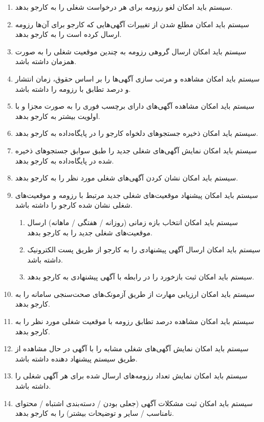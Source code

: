 \documentclass[12pt]{article}
\begin{document}
\begin{itemize}
\begin{enumerate}
\begin{enumerate}
			\end{enumerate}
			\item سیستم باید امکان لغو رزومه برای هر درخواست شغلی را به کارجو بدهد.
			\item سیستم باید امکان مطلع شدن از تغییرات آگهی‌هایی که کارجو برای آن‌ها رزومه ارسال کرده است را به کارجو بدهد.
			\item سیستم باید امکان ارسال گروهی رزومه به چندین موقعیت شغلی را به صورت همزمان داشته باشد.
			\item سیستم باید امکان مشاهده و مرتب سازی آگهی‌ها را بر اساس حقوق، زمان انتشار و درصد تطابق با رزومه را داشته باشد.
			\item سیستم باید امکان مشاهده آگهی‌های دارای برچسب فوری را به صورت مجزا و با اولویت بیشتر به کارجو بدهد.
			\item سیستم باید امکان ذخیره جستجوهای دلخواه کارجو را در پایگاه‌داده به کارجو بدهد.
			\item سیستم باید امکان نمایش آگهی‌های شغلی جدید را طبق سوابق جستجوهای ذخیره شده در پایگاه‌داده به کارجو بدهد.
			\item سیستم باید امکان نشان کردن آگهی‌های شغلی مورد نظر را به کارجو بدهد.
			\item سیستم باید امکان پیشنهاد موقعیت‌های شغلی جدید مرتبط با رزومه و موقعیت‌های شغلی نشان شده کارجو را داشته باشد.
			\begin{enumerate}
				\renewcommand{\labelenumii}{-R\arabic{enumi}.\arabic{enumii}}
				\item سیستم باید امکان انتخاب بازه زمانی (روزانه / هفتگی / ماهانه) ارسال موقعیت‌های شغلی جدید را به کارجو بدهد.
				\item سیستم باید امکان ارسال آگهی پیشنهادی را به کارجو از طریق پست الکترونیک داشته باشد.
				\item سیستم باید امکان ثبت بازخورد را در رابطه با آگهی پیشنهادی به کارجو بدهد.
			\end{enumerate}
			\item سیستم باید امکان ارزیابی مهارت از طریق آزمونک‌های صحت‌سنجی سامانه را به کارجو بدهد.
			\item سیستم باید امکان مشاهده درصد تطابق رزومه با موقعیت شغلی مورد نظر را به کارجو بدهد.
			\item سیستم باید امکان نمایش آگهی‌های شغلی مشابه را با آگهی در حال مشاهده از طریق سیستم پیشنهاد دهنده داشته باشد.
			\item سیستم باید امکان نمایش تعداد رزومه‌های ارسال شده برای هر آگهی شغلی را داشته باشد.
			\item سیستم باید امکان ثبت مشکلات آگهی (جعلی بودن / دسته‌بندی اشتباه / محتوای نامناسب / سایر و توضیحات بیشتر) را به کارجو بدهد.

\end{enumerate}
\end{itemize}
\end{document}
